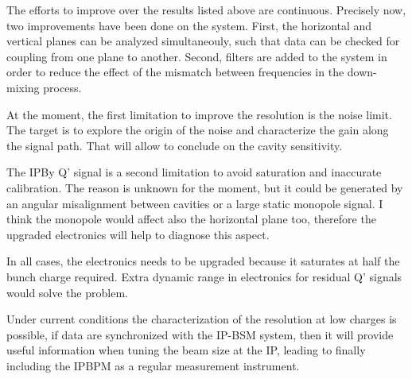 The efforts to improve over the results listed above are continuous. Precisely now, two improvements have been done on the system. First, the horizontal and vertical planes can be analyzed simultaneouly, such that data can be checked for coupling from one plane to another. Second, filters are added to the system in order to reduce the effect of the mismatch between frequencies in the down-mixing process.\par
At the moment, the first limitation to improve the resolution is the noise limit. The target is to explore the origin of the noise and characterize the gain along the signal path. That will allow to conclude on the cavity sensitivity.\par
The IPBy Q' signal is a second limitation to avoid saturation and inaccurate calibration. The reason is unknown for the moment, but it could be generated by an angular misalignment between cavities or a large static monopole signal. I think the monopole would affect also the horizontal plane too, therefore the upgraded electronics will help to diagnose this aspect.\par
In all cases, the electronics needs to be upgraded because it saturates at half the bunch charge required. Extra dynamic range in electronics for residual Q' signals would solve the problem.\par
Under current conditions the characterization of the resolution at low charges is possible, if data are synchronized with the IP-BSM system, then it will provide useful information when tuning the beam size at the IP, leading to finally including the IPBPM as a regular measurement instrument.\par
